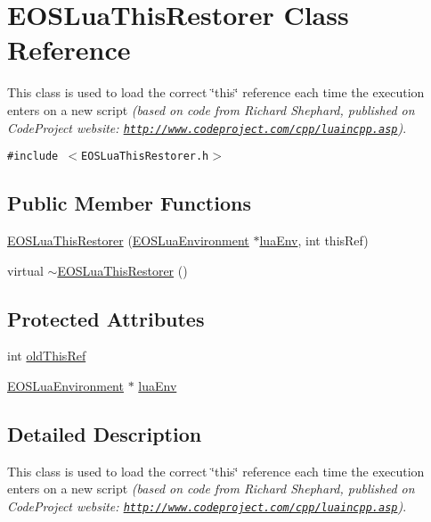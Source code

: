 \hypertarget{classEOSLuaThisRestorer}{
\section{EOSLuaThisRestorer Class Reference}
\label{classEOSLuaThisRestorer}
}
This class is used to load the correct \char`\"{}this\char`\"{} reference each time the execution enters on a new script {\em (based on code from Richard Shephard, published on CodeProject website: \href{http://www.codeproject.com/cpp/luaincpp.asp}{\tt http://www.codeproject.com/cpp/luaincpp.asp})\/}.  


{\tt \#include $<$EOSLuaThisRestorer.h$>$}

\subsection*{Public Member Functions}
\begin{CompactItemize}
\item 
\hyperlink{classEOSLuaThisRestorer_81ca0a43271615529a47f3983c5ffe30}{EOSLuaThisRestorer} (\hyperlink{classEOSLuaEnvironment}{EOSLuaEnvironment} $\ast$\hyperlink{classEOSLuaThisRestorer_97a1c3bec2094802ad9976b63ec6269f}{luaEnv}, int thisRef)
\item 
virtual \hyperlink{classEOSLuaThisRestorer_f674e78a80a788f6ceaaf3762572ab9d}{$\sim$EOSLuaThisRestorer} ()
\end{CompactItemize}
\subsection*{Protected Attributes}
\begin{CompactItemize}
\item 
int \hyperlink{classEOSLuaThisRestorer_ab1eec278bb8cda42e152ec7d82c8d3a}{oldThisRef}
\item 
\hyperlink{classEOSLuaEnvironment}{EOSLuaEnvironment} $\ast$ \hyperlink{classEOSLuaThisRestorer_97a1c3bec2094802ad9976b63ec6269f}{luaEnv}
\end{CompactItemize}


\subsection{Detailed Description}
This class is used to load the correct \char`\"{}this\char`\"{} reference each time the execution enters on a new script {\em (based on code from Richard Shephard, published on CodeProject website: \href{http://www.codeproject.com/cpp/luaincpp.asp}{\tt http://www.codeproject.com/cpp/luaincpp.asp})\/}. 

